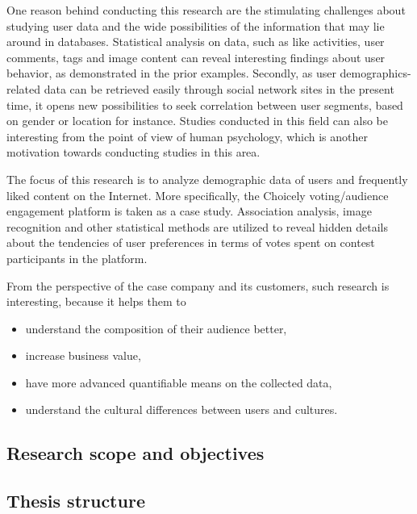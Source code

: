     One reason behind conducting this research are the stimulating challenges about studying user data and the wide possibilities of the information that may lie around in databases. Statistical analysis on data, such as like activities, user comments, tags and image content can reveal interesting findings about user behavior, as demonstrated in the prior examples. Secondly, as user demographics-related data can be retrieved easily through social network sites in the present time, it opens new possibilities to seek correlation between user segments, based on gender or location for instance. Studies conducted in this field can also be interesting from the point of view of human psychology, which is another motivation towards conducting studies in this area. 

    The focus of this research is to analyze demographic data of users and frequently liked content on the Internet. More specifically, the Choicely voting/audience engagement platform is taken as a case study. Association analysis, image recognition and other statistical methods are utilized to reveal hidden details about the tendencies of user preferences in terms of votes spent on contest participants in the platform.   

    From the perspective of the case company and its customers, such research is interesting, because it helps them to 

    \begin{itemize}
        \item understand the composition of their audience better,
        \item increase business value,
        \item have more advanced quantifiable means on the collected data,
        \item understand the cultural differences between users and cultures. 
    \end{itemize} 

\subsection{Research scope and objectives}


\subsection{Thesis structure}

